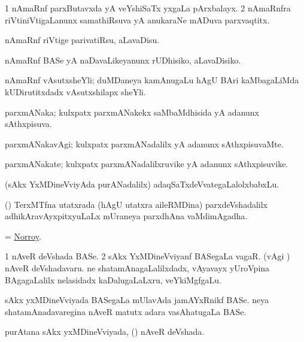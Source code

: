 \bentry
{}
\gl{\nA}
\bmng
\bnum
\num{1} nAmaRnf parxButavxda yA veYshiSaTx yxgaLa pArxbalayx. 
\num{2} nAmaRnfra riVtiniVtigaLanunx samathiRsuva yA anukaraNe mADuva parxvaqtitx. 
\enum
\emng
\eentry

\bentry
{}
\gl{\sakirx}
\bmng
nAmaRnf riVtige parivatiRsu, aLavaDisu. 
\emng

\noindent
\gl{\akirx}
\bmng
nAmaRnf BASe yA naDavaLikeyanunx rUDhisiko, aLavaDisiko. 
\emng
\eentry

\bentry
{}
\gl{\nA}
\bmng
nAmaRnf vAsutxsheYli; duMDaneya kamAnugaLu hAgU BAri kaMbagaLiMda kUDirutitxdadx vAsutxshilapx sheYli. 
\emng
\eentry

\bentry
{}
\gl{\gu}
\bmng
parxmANaka; kulxpatx parxmANakekx saMbaMdhisida yA adanunx sAthxpisuva. 
\emng
\eentry

\bentry
{}
\gl{\kirxvi}
\bmng
parxmANakavAgi; kulxpatx parxmANadalilx yA adanunx sAthxpisuvaMte. 
\emng
\eentry

\bentry
{}
\gl{\nA}
\bmng
parxmANakate; kulxpatx parxmANadalilxruvike yA adanunx sAthxpisuvike. 
\emng
\eentry

\bentry
{}
\gl{\nA}
\bmng
(sAkx YxMDineVviyAda purANadalilx) adaqSaTxdeVvategaLalolxbabxLu. 
\emng
\eentry

\bentry
{}
\gl{\nA}
\bmng
(\birx) TerxMTfna utatxrada (hAgU utatxra aileRMDina) parxdeVshadalilx adhikAravAyxpitxyuLaLx mUraneya parxdhAna vaMdimAgadha. 
\emng

\noindent
\gl{\pagu}
\bmng
{} = \hyperlink{Norroy}{Norroy}. 
\emng
\eentry

\bentry
{}
\gl{\nA}
\bmng
\bnum
\num{1} nAveR deVshada BASe. 
\num{2} sAkx YxMDineVviyanf BASegaLa vagaR. 
 (\bava vAgi \parx) 
\banum
{} nAveR deVshadavaru. 
 ne shatamAnagaLalilxdadx, vAyavayx yUroVpina BAgagaLalilx nelasidadx kaDalugaLaLxru, veYkiMgfgaLu. 
\eanum
\numie
\enum
\emng

\noindent
\gl{\pagu}
\bmng
{} 
\banum
{} sAkx yxMDineVviyada BASegaLa mUlavAda jamAYxRnikf BASe. 
 neya shatamAnadavaregina nAveR matutx adara vasAhatugaLa BASe. 
\eanum
\emng
\eentry

\bentry
{}
\gl{\gu}
\bmng
purAtana sAkx yxMDineVviyada, (\kanmu) nAveR deVshada. 
\emng
\eentry

